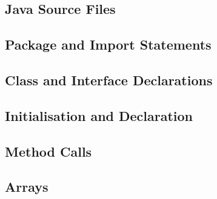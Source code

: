 \subsection{Java Source Files}
\subsection{Package and Import Statements}
\subsection{Class and Interface Declarations}
\subsection{Initialisation and Declaration}
\subsection{Method Calls}
\subsection{Arrays}





